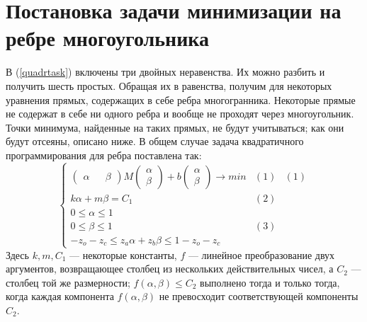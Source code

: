 \documentclass[pdftex,ptm,12pt,a4paper]{report}
\begin{document}
\section{Постановка задачи минимизации на ребре многоугольника}
  В (\ref{quadrtask}) включены три двойных неравенства.
  Их можно разбить и получить шесть простых.
  Обращая их в равенства, получим для некоторых уравнения прямых, содержащих в себе ребра многогранника.
  Некоторые прямые не содержат в себе ни одного ребра и вообще не проходят через многоугольник.
  Точки минимума, найденные на таких прямых, не будут учитываться; как они будут отсеяны, описано ниже.
  В общем случае задача квадратичного программирования для ребра поставлена так:
  \begin{equation}\label{task1dim}
          \begin{cases}
          \begin{pmatrix} \alpha && \beta \end{pmatrix}
               M
             \begin{pmatrix} \alpha \\ \beta \end{pmatrix} +
             b \begin{pmatrix} \alpha \\ \beta \end{pmatrix} \to min &(1) & (1)\\
             k \alpha + m \beta = C_1 & (2) \\
             0 \le  \alpha   \le  1  \\
             0 \le  \beta   \le  1  &(3)\\
              -z_o - z_c \le  z_a \alpha + z_b \beta \le  1 -z_o - z_c
          \end{cases}
      \end{equation}
  Здесь $k, m, C_1$ --- некоторые константы,
  $f$ --- линейное преобразование двух аргументов, возвращающее столбец из нескольких действительных чисел,
  а $C_2$ --- столбец той же размерности;
  $f(\alpha, \beta) \le C_2$ выполнено тогда и только тогда, когда каждая компонента $f(\alpha, \beta)$ не превосходит соответствующей компоненты $C_2$.
\end{document}
